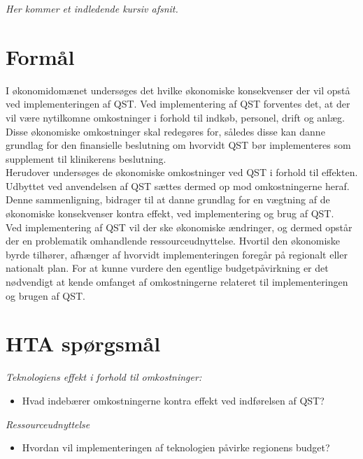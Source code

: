 \textit{Her kommer et indledende kursiv afsnit.}
\section{Formål}
I økonomidomænet undersøges det hvilke økonomiske konsekvenser der vil opstå ved implementeringen af QST. Ved implementering af QST forventes det, at der vil være nytilkomne omkostninger i forhold til indkøb, personel, drift og anlæg. Disse økonomiske omkostninger skal redegøres for, således disse kan danne grundlag for den finansielle beslutning om hvorvidt QST bør implementeres som supplement til klinikerens beslutning. \\
Herudover undersøges de økonomiske omkostninger ved QST i forhold til effekten. Udbyttet ved anvendelsen af QST sættes dermed op mod omkostningerne heraf. Denne sammenligning, bidrager til at danne grundlag for en vægtning af de økonomiske konsekvenser kontra effekt, ved implementering og brug af QST. \\ 
Ved implementering af QST vil der ske økonomiske ændringer, og dermed opstår der en problematik omhandlende ressourceudnyttelse. Hvortil den økonomiske byrde tilhører, afhænger af hvorvidt implementeringen foregår på regionalt eller nationalt plan. For at kunne vurdere den egentlige budgetpåvirkning er det nødvendigt at kende omfanget af  omkostningerne relateret til implementeringen og brugen af QST. 
\section{HTA spørgsmål}
\textit{Teknologiens effekt i forhold til omkostninger:}
\begin{itemize}
	\item Hvad indebærer omkostningerne kontra effekt ved indførelsen af QST? %
\end{itemize}

\textit{Ressourceudnyttelse}
\begin{itemize}
	\item Hvordan vil implementeringen af teknologien påvirke regionens budget?%
\end{itemize}

